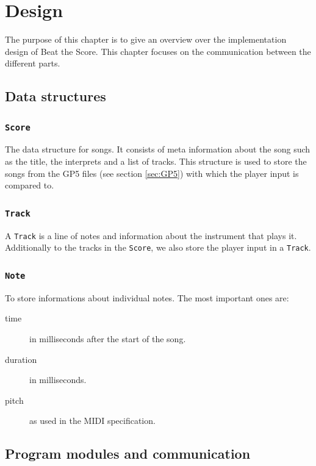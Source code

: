 
\chapter[Design \textsuperscript{Kugler}]{Design}
\label{chap:Design}
The purpose of this chapter is to give an overview over the implementation design of Beat the Score. This chapter focuses on the communication between the different parts. 

\section{Data structures}

\subsection{{\tt Score}}

The data structure for songs. It consists of meta information about the song such as the title, the interprets and a list of tracks. This structure is used to store the songs from the GP5 files (see section \ref{sec:GP5}) with which the player input is compared to.

\subsection{{\tt Track}}

A {\tt Track} is a line of notes and information about the instrument that plays it. Additionally to the tracks in the {\tt Score}, we also store the player input in a {\tt Track}.

\subsection{{\tt Note}}

To store informations about individual notes. The most important ones are:
\begin{description}
	\item[time] in milliseconds after the start of the song. 
	\item[duration] in milliseconds.
	\item[pitch] as used in the MIDI specification.
\end{description}

\section{Program modules and communication}

